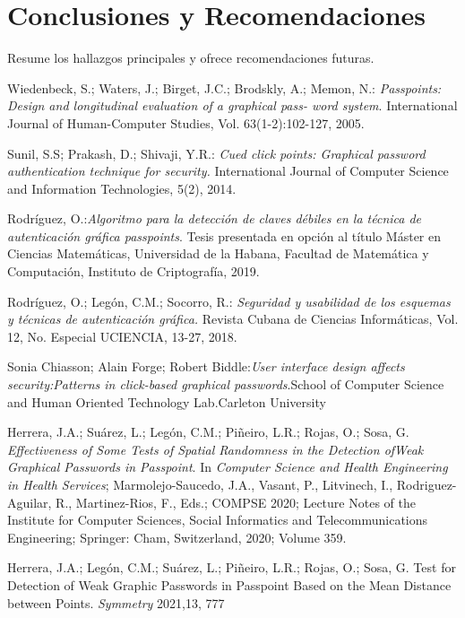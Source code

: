 \documentclass[12pt]{report}
\begin{document}
\chapter{Conclusiones y Recomendaciones}
Resume los hallazgos principales y ofrece recomendaciones futuras.


\begin{thebibliography}{9}
	\normalsize{
		 Wiedenbeck, S.; Waters, J.; Birget, J.C.; Brodskly, A.; Memon, N.:\textit{ Passpoints: Design and
		longitudinal evaluation of a graphical pass- word system}. International Journal of Human-Computer
		Studies, Vol. 63(1-2):102-127, 2005.
	
		 Sunil, S.S; Prakash, D.; Shivaji, Y.R.:\textit{ Cued click points: Graphical password authentication technique
		for security.} International Journal of Computer Science and Information Technologies, 5(2), 2014.
	
		 Rodríguez, O.:\textit{Algoritmo para la detección de claves débiles en la técnica de autenticación gráfica passpoints}. Tesis presentada en opción al título Máster en Ciencias Matemáticas, Universidad de la
		Habana, Facultad de Matemática y Computación, Instituto de Criptografía, 2019.
	
		 Rodríguez, O.; Legón, C.M.; Socorro, R.: \textit{Seguridad y usabilidad de los esquemas y técnicas de autenticación gráfica.} Revista Cubana de Ciencias Informáticas, Vol. 12, No. Especial UCIENCIA,
		13-27, 2018.
		
		 Sonia Chiasson; Alain Forge; Robert Biddle:\textit{User interface design affects security:Patterns in
		click-based graphical passwords}.School of Computer Science and Human Oriented Technology
		Lab.Carleton University
		
		Herrera, J.A.; Suárez, L.; Legón, C.M.; Piñeiro, L.R.; Rojas, O.; Sosa, G.\textit{ Effectiveness of Some Tests of Spatial Randomness in the Detection ofWeak Graphical Passwords in Passpoint}. In \textit{Computer Science and Health Engineering in Health Services}; Marmolejo-Saucedo, J.A., Vasant, P., Litvinech, I., Rodriguez-Aguilar, R., Martinez-Rios, F., Eds.; COMPSE 2020; Lecture Notes of the Institute for Computer Sciences, Social Informatics and Telecommunications Engineering; Springer: Cham, Switzerland, 2020; Volume 359.
		
		Herrera, J.A.; Legón, C.M.; Suárez, L.; Piñeiro, L.R.; Rojas, O.; Sosa, G. Test for Detection of Weak Graphic Passwords in Passpoint Based on the Mean Distance between Points.\textit{ Symmetry} 2021,13, 777
		
}
\end{thebibliography}
\end{document}
